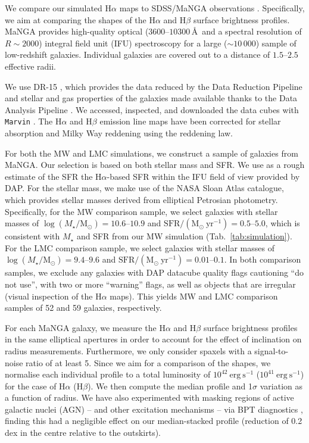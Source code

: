 \documentclass[fleqn,usenatbib]{mnras}
\begin{document}
We compare our simulated H$\alpha$ maps to SDSS/MaNGA observations \citep{bundy15}. Specifically, we aim at comparing the shapes of the H$\alpha$ and H$\beta$ surface brightness profiles. MaNGA provides high-quality optical ($3600$--$10300$\,\AA\ and a spectral resolution of $R\sim2000$) integral field unit (IFU) spectroscopy for a large ($\sim10\,000$) sample of low-redshift galaxies. Individual galaxies are covered out to a distance of $1.5$--$2.5$ effective radii.

We use DR-15 \citep{aguado19}, which provides the data reduced by the Data Reduction Pipeline \citep[DRP;][]{law16} and stellar and gas properties of the galaxies made available thanks to the Data Analysis Pipeline \citep[DAP;][]{westfall19, belfiore19}. We accessed, inspected, and downloaded the data cubes with \texttt{Marvin} \citep{cherinka19}. The H$\alpha$ and H$\beta$ emission line maps have been corrected for stellar absorption and Milky Way reddening using the \citet{odonnell94} reddening law.

For both the MW and LMC simulations, we construct a sample of galaxies from MaNGA. Our selection is based on both stellar mass and SFR. We use as a rough estimate of the SFR the H$\alpha$-based SFR within the IFU field of view provided by DAP. For the stellar mass, we make use of the NASA Sloan Atlas \citep[NSA;][]{blanton05, blanton11} catalogue, which provides stellar masses derived from elliptical Petrosian photometry. Specifically, for the MW comparison sample, we select galaxies with stellar masses of $\log(M_{\star}/\text{M}_{\odot})=10.6$--$10.9$ and $\mathrm{SFR}/(\text{M}_{\odot}~\mathrm{yr}^{-1})=0.5$--$5.0$, which is consistent with $M_{\star}$ and SFR from our MW simulation (Tab.~\ref{tab:simulation}). For the LMC comparison sample, we select galaxies with stellar masses of $\log(M_{\star}/\text{M}_{\odot})=9.4$--$9.6$ and $\mathrm{SFR}/(\text{M}_{\odot}~\mathrm{yr}^{-1})=0.01$--$0.1$. In both comparison samples, we exclude any galaxies with DAP datacube quality flags cautioning ``do not use'', with two or more ``warning'' flags, as well as objects that are irregular (visual inspection of the H$\alpha$ maps). This yields MW and LMC comparison samples of 52 and 59 galaxies, respectively.

For each MaNGA galaxy, we measure the H$\alpha$ and H$\beta$ surface brightness profiles in the same elliptical apertures in order to account for the effect of inclination on radius measurements. Furthermore, we only consider spaxels with a signal-to-noise ratio of at least 5. Since we aim for a comparison of the shapes, we normalise each individual profile to a total luminosity of $10^{42}~\mathrm{erg}~\mathrm{s}^{-1}$ ($10^{41}~\mathrm{erg}~\mathrm{s}^{-1}$) for the case of H$\alpha$ (H$\beta$). We then compute the median profile and 1$\sigma$ variation as a function of radius. We have also experimented with masking regions of active galactic nuclei (AGN) -- and other excitation mechanisms -- via BPT diagnostics \citep{baldwin81}, finding this had a negligible effect on our median-stacked profile (reduction of 0.2 dex in the centre relative to the outskirts).
\end{document}
